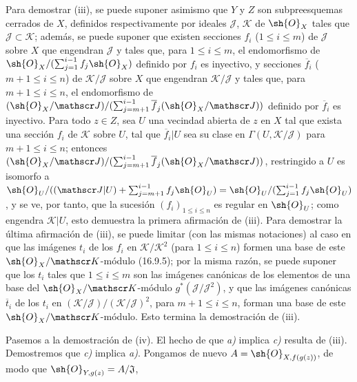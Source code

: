 Para demostrar (iii), se puede suponer asimismo que $Y$ y $Z$ son subpreesquemas cerrados de $X$, definidos respectivamente por ideales $\mathscr J$, $\mathscr K$ de $\sh{O}_X$ tales que $\mathscr J\subset\mathscr K$; además, se puede suponer que existen secciones $f_i$ ($1\leq i\leq m$) de $\mathscr J$ sobre $X$ que engendran $\mathscr J$ y tales que, para $1\leq i\leq m$, el endomorfismo de $\sh{O}_X/(\sum_{j=1}^{i-1}f_j\sh{O}_X)$ definido por $f_i$ es inyectivo, y secciones $\overline f_i$ ($m+1\leq i\leq n$) de $\mathscr K/\mathscr J$ sobre $X$ que engendran $\mathscr K/\mathscr J$ y tales que, para $m+1\leq i\leq n$, el endomorfismo de
$(\sh{O}_X/\mathscr J)/(\sum_{j=m+1}^{i-1}\overline f_j(\sh{O}_X/\mathscr J))$
definido por $\overline f_i$ es inyectivo. Para todo $z\in Z$, sea $U$ una vecindad abierta de $z$ en $X$ tal que exista una sección $f_i$ de $\mathscr K$ sobre $U$, tal que $\overline f_i|U$ sea su clase en $\Gamma(U,\mathscr K/\mathscr J)$ para $m+1\leq i\leq n$; entonces
$(\sh{O}_X/\mathscr J)/(\sum_{j=m+1}^{i-1}\overline f_j(\sh{O}_X/\mathscr J))$,
restringido a $U$ es isomorfo a
$\sh{O}_U/((\mathscr J|U)+\sum_{j=m+1}^{i-1}f_j\sh{O}_U)=\sh{O}_U/(\sum_{j=1}^{i-1}f_j\sh{O}_U)$,
y se ve, por tanto, que la sucesión $(f_i)_{1\leq i\leq n}$ es regular en $\sh{O}_U$; como engendra $\mathscr K|U$, esto demuestra la primera afirmación de (iii). Para demostrar la última afirmación de (iii), se puede limitar (con las mismas notaciones) al caso en que las imágenes $t_i$ de los $f_i$ en $\mathscr K/\mathscr K^2$ (para $1\leq i\leq n$) formen una base de este $\sh{O}_X/\mathscr K$-módulo (16.9.5); por la misma razón, se puede suponer que los $t_i$ tales que $1\leq i\leq m$ son las imágenes canónicas de los elementos de una base del $\sh{O}_X/\mathscr K$-módulo $g^*(\mathscr J/\mathscr J^2)$, y que las imágenes canónicas $\overline t_i$ de los $t_i$ en $(\mathscr K/\mathscr J)/(\mathscr K/\mathscr J)^2$, para $m+1\leq i\leq n$, forman una base de este $\sh{O}_X/\mathscr K$-módulo. Esto termina la demostración de (iii).

Pasemos a la demostración de (iv). El hecho de que \emph{a)} implica \emph{c)} resulta de (iii). Demostremos que \emph{c)} implica \emph{a)}. Pongamos de nuevo $A=\sh{O}_{X,f(g(z))}$, de modo que $\sh{O}_{Y,g(z)}=A/\mathfrak J$,


